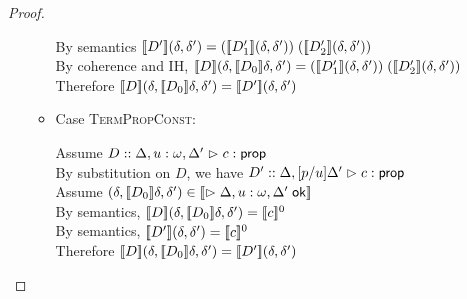 \begin{proof}
\begin{enumerate}
\begin{itemize}
\begin{tabbedproof}
      \oooo By semantics $\interp{D'}(\delta, \delta') = 
             (\interp{D'_1}(\delta, \delta'))\;
             (\interp{D'_2}(\delta, \delta'))$ \\
      \oooo By coherence and IH,  
            $\interp{D}(\delta, \interp{D_0}\delta, \delta') = 
             (\interp{D'_1}(\delta, \delta'))\;
             (\interp{D'_2}(\delta, \delta'))$ \\
      \oooo Therefore $\interp{D}(\delta, \interp{D_0}\delta, \delta') = 
                       \interp{D'}(\delta, \delta')$ \\
    \end{tabbedproof}

  \item Case \textsc{TermPropConst}: 
    \begin{tabbedproof}
      \oo Assume $D :: \judgeA[{\Delta, u:\omega, \Delta'}]{c}{\assert}$ \\
      \ooo By substitution on $D$, we have $D' :: \judgeA[{\Delta, [p/u]\Delta'}]{c}{\assert}$ \\
      \ooo Assume $(\delta, \interp{D_0}\delta, \delta') \in \interp{\judgeACtx{\Delta, u:\omega, \Delta'}}$ \\
      \oooo By semantics, $\interp{D}(\delta, \interp{D_0}\delta, \delta') = \interp{c}^0$ \\
      \oooo By semantics, $\interp{D'}(\delta, \delta') = \interp{c}^0$ \\
      \oooo Therefore $\interp{D}(\delta, \interp{D_0}\delta, \delta') = 
                       \interp{D'}(\delta, \delta')$ \\
    \end{tabbedproof}


\end{itemize}
\end{enumerate}
\end{proof}
